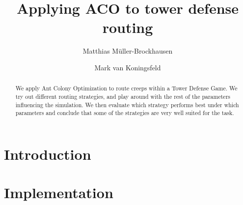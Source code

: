\documentclass[runningheads,a4paper]{llncs}
\begin{document}
\mainmatter  %

\title{Applying ACO to tower defense routing}


%
%
\author{Matthias Müller-Brockhausen \and Mark van Koningsfeld}
%


%
%

\maketitle


\begin{abstract}
We apply Ant Colony Optimization to route creeps within a Tower Defense Game. We try out different routing strategies, and play around with the rest of the parameters influencing the simulation. We then evaluate which strategy performs best under which parameters and conclude that some of the strategies are very well suited for the task.
\end{abstract}




\section{Introduction}
\label{sec:introduction}


\section{Implementation}
\label{sec:implementation}

\end{document}
